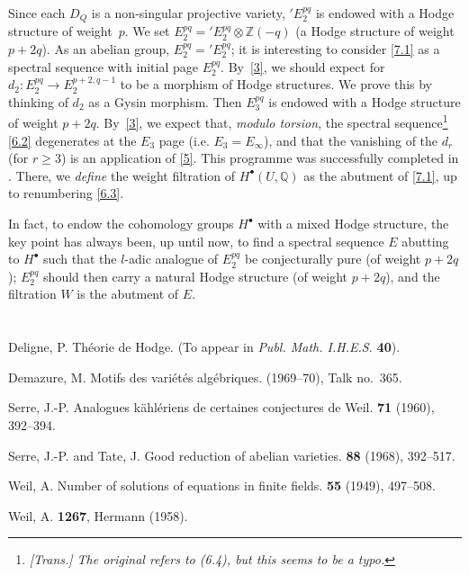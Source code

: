 \documentclass{article}
\theoremstyle{plain}
\theoremstyle{definition}
\newcommand{\ZZ}{\mathbb{Z}}
\newcommand{\QQ}{\mathbb{Q}}
\renewcommand{\geq}{\geqslant}
\newcommand{\oldpage}[1]{\marginpar{\footnotesize$\Big\vert$ \textit{p.~#1}}}
\begin{document}
\oldpage{428}
Since each $D_Q$ is a non-singular projective variety, $'E_2^{pq}$ is endowed with a Hodge structure of weight~$p$.
We set $E_2^{pq}='E_2^{pq}\otimes\ZZ(-q)$ (a Hodge structure of weight $p+2q$).
As an abelian group, $E_2^{pq}='E_2^{pq}$;
it is interesting to consider \cref{7.1} as a spectral sequence with initial page $E_2^{pq}$.
By~\cref{3}, we should expect for $d_2\colon E_2^{pq}\to E_2^{p+2,q-1}$ to be a morphism of Hodge structures.
We prove this by thinking of $d_2$ as a Gysin morphism.
Then $E_3^{pq}$ is endowed with a Hodge structure of weight $p+2q$.
By~\cref{3}, we expect that, \emph{modulo torsion}, the spectral sequence\footnote{\emph{[Trans.] The original refers to (6.4), but this seems to be a typo.}} \cref{6.2} degenerates at the $E_3$ page (i.e. $E_3=E_\infty$), and that the vanishing of the $d_r$ (for $r\geq3$) is an application of \cref{5}.
This programme was successfully completed in \cite[§3.2]{1}.
There, we \emph{define} the weight filtration of $H^\bullet(U,\QQ)$ as the abutment of \cref{7.1}, up to renumbering \cref{6.3}.

In fact, to endow the cohomology groups $H^\bullet$ with a mixed Hodge structure, the key point has always been, up until now, to find a spectral sequence $E$ abutting to $H^\bullet$ such that the $l$-adic analogue of $E_2^{pq}$ be conjecturally pure (of weight $p+2q$);
$E_2^{pq}$ should then carry a natural Hodge structure (of weight $p+2q$), and the filtration $W$ is the abutment of $E$.


\section{}
\label{8}




\nocite{*}

\begin{thebibliography}{6}

  {\sc Deligne, P.}
  \newblock Th\'{e}orie de Hodge.
  \newblock (To appear in {\em Publ. Math. I.H.E.S.} \textbf{40}).

  {\sc Demazure, M.}
  \newblock Motifs des vari\'{e}t\'{e}s alg\'{e}briques.
   (1969--70), Talk no.~365.

  {\sc Serre, J.-P.}
  \newblock Analogues k\"{a}hl\'{e}riens de certaines conjectures de Weil.
   \textbf{71} (1960), 392--394.

  {\sc Serre, J.-P. and Tate, J.}
  \newblock Good reduction of abelian varieties.
   \textbf{88} (1968), 392--517.

  {\sc Weil, A.}
  \newblock Number of solutions of equations in finite fields.
   \textbf{55} (1949), 497--508.

  {\sc Weil, A.}
   \textbf{1267}, Hermann (1958).

\end{thebibliography}
\end{document}
